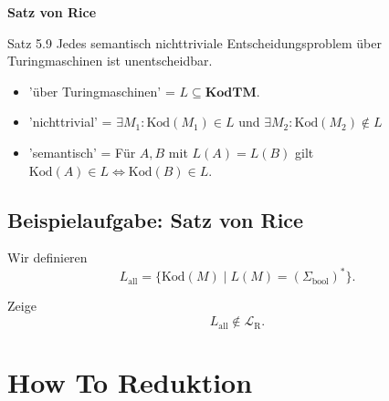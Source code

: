 \documentclass[a4paper, 11pt]{article}
\def\Lr{\mathcal{L}_\text{R}}
\newcommand\myTitle[1]{{\large \textbf {#1}}}
\begin{document}
                    \myTitle{Satz von Rice}
                    \begin{mainbox}{Satz 5.9}
                        Jedes semantisch nichttriviale Entscheidungsproblem über Turingmaschinen ist unentscheidbar.
                    \end{mainbox}
                    \begin{itemize}
                        \item 'über Turingmaschinen' = $L \subseteq \textbf{KodTM}$.
                        \item 'nichttrivial' = $\exists M_1: \text{Kod}(M_1) \in L$ und $\exists M_2: \text{Kod}(M_2) \notin L$
                        \item 'semantisch' = Für $A, B$ mit $L(A) = L(B)$ gilt $\text{Kod}(A) \in L \iff \text{Kod}(B) \in L$.
                    \end{itemize}
                
                    
                
                    \subsection{Beispielaufgabe: Satz von Rice}
                    Wir definieren $$L_{\text{all}} = \{\text{Kod}(M) \mid L(M) = (\Sigma_{\text{bool}})^*\}.$$
                
                    Zeige $$L_{\text{all}} \notin \Lr.$$
                
                
                
                
                \section{How To Reduktion}
                
\end{document}

